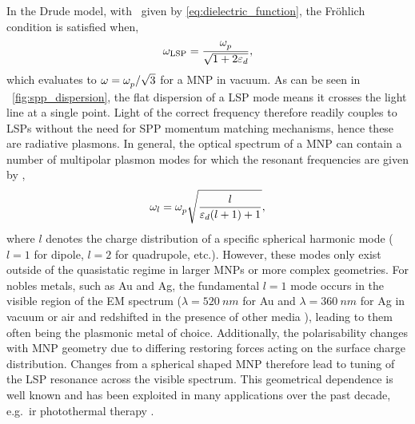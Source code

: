 \documentclass{article}
\begin{document}
In the Drude model, with \dielectric\ given by \eqref{eq:dielectric_function}, the Fr\"{o}hlich condition is satisfied when,
\begin{equation}
	\omega_{\mathrm{LSP}} = \frac{\omega_{p}^{}}{\sqrt{1+2\varepsilon_d}},
\end{equation}
which evaluates to $\omega = \omega_{p}^{}/\sqrt{3}$ for a MNP in vacuum. As can be seen in \figurename~\ref{fig:spp_dispersion}, the flat dispersion of a LSP mode means it crosses the light line at a single point. Light of the correct frequency therefore readily couples to LSPs without the need for SPP momentum matching mechanisms, hence these are radiative plasmons.
In general, the optical spectrum of a MNP can contain a number of multipolar plasmon modes for which the resonant frequencies are given by \cite{prodan2004},
\begin{equation}
	\omega_l = \omega_{p}^{}\sqrt{\frac{l}{\varepsilon_d(l+1)+1}},
\end{equation}
where $l$ denotes the charge distribution of a specific spherical harmonic mode ($l=1$ for dipole, $l=2$ for quadrupole, etc.). However, these modes only exist outside of the quasistatic regime in larger MNPs or more complex geometries.
For nobles metals, such as Au and Ag, the fundamental $l=1$ mode occurs in the visible region of the EM spectrum ($\lambda=\SI{520}{nm}$ for Au and $\lambda=\SI{360}{nm}$ for Ag in vacuum or air \cite{maier2007plasmonics} and redshifted in the presence of other media \cite{sonnichsen2000}), leading to them often being the plasmonic metal of choice.
Additionally, the polarisability changes with MNP geometry due to differing restoring forces acting on the surface charge distribution. Changes from a spherical shaped MNP therefore lead to tuning of the LSP resonance across the visible spectrum. This geometrical dependence is well known \cite{krenn2000, mock2002, kuwata2003} and has been exploited in many applications over the past decade, e.g.\ \gls{ir} photothermal therapy \cite{huang2006, huang2008, huang2010gold}.
\end{document}
